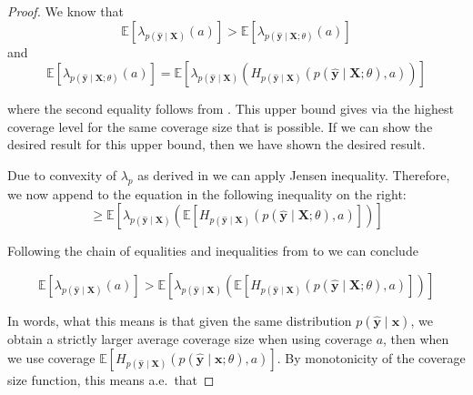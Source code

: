 \begin{proof}
    We know that
    \begin{equation}
        \mathbb{E}\left[\lambda_{p(\mathbf{\hat{y}}\mid\mathbf{X})}(a)\right] > \mathbb{E}\left[ \lambda_{p(\mathbf{\hat{y}}\mid\mathbf{X};\theta)}( a) \right]
        \label{eq:inequality_0}
    \end{equation}
    and
    \begin{equation}
        \mathbb{E}\left[ \lambda_{p(\mathbf{\hat{y}}\mid\mathbf{X}; \theta)}( a) \right]
        =\mathbb{E}\left[ \lambda_{p(\mathbf{\hat{y}}\mid\mathbf{X})}\left(
            H_{p(\hat{\mathbf{y}}\mid \mathbf{X})}(p(\mathbf{\hat{y}}\mid \mathbf{X}; \theta), a)\right)
            \right]
        \label{eq:inequality_1}
    \end{equation}

    where the second equality follows from . This upper bound gives via  the highest coverage level for the same coverage size that is possible. If we can show the desired result for this upper bound, then we have shown the desired result.

    Due to convexity of $\lambda_p$ as derived in  we can apply Jensen inequality. Therefore, we now append to the equation in  the following inequality on the right:
    \begin{equation}\label{eq:inequality_2_1}
        \geq \mathbb{E}\left[ \lambda_{p(\mathbf{\hat{y}}\mid\mathbf{X})}\left(
            \mathbb{E}\left[H_{p(\hat{\mathbf{y}}\mid \mathbf{X})}(p(\mathbf{\hat{y}}\mid \mathbf{X};
                \theta), a)
                \right] \right)\right]
    \end{equation}

    Following the chain of equalities and inequalities from  to  we can conclude

    \begin{equation}
        \mathbb{E}\left[\lambda_{p(\mathbf{\hat{y}}\mid\mathbf{X})}(a)\right]
        > \mathbb{E}\left[ \lambda_{p(\mathbf{\hat{y}}\mid\mathbf{X})}\left(
            \mathbb{E}\left[H_{p(\hat{\mathbf{y}}\mid \mathbf{X})}(p(\mathbf{\hat{y}}\mid \mathbf{X};
                \theta), a)
                \right] \right)\right]
    \end{equation}

    In words, what this means is that given the same distribution $p(\mathbf{\hat{y}}\mid\mathbf{x})$, we obtain a strictly larger average coverage size when using coverage $a$, then when we use coverage $\mathbb{E}\left[H_{p(\hat{\mathbf{y}}\mid \mathbf{X})}(p(\mathbf{\hat{y}}\mid \mathbf{x};\theta), a)\right]$. By monotonicity of the coverage size function, this means a.e.\ that


\end{proof}
